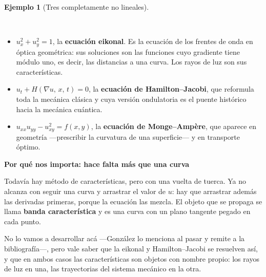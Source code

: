 \documentclass[
  spanish,
  a4paper,
]{scrbook}
\providecommand{\tightlist}{%
  \setlength{\itemsep}{0pt}\setlength{\parskip}{0pt}}
\theoremstyle{definition}
\theoremstyle{plain}
\theoremstyle{definition}
\newtheorem{example}{Ejemplo}[chapter]
\theoremstyle{plain}
\theoremstyle{definition}
\theoremstyle{remark}
\begin{document}
\begin{example}[Tres completamente no
lineales]\protect\hypertarget{exm-no-lineales}{}\label{exm-no-lineales}

~

\begin{itemize}
\tightlist
\item
  \(u_x^2 + u_y^2 = 1\), la \textbf{ecuación eikonal}. Es la ecuación de
  los frentes de onda en óptica geométrica: sus soluciones son las
  funciones cuyo gradiente tiene módulo uno, es decir, las distancias a
  una curva. Los rayos de luz son sus características.
\item
  \(u_t + H(\nabla u,\, x,\, t) = 0\), la \textbf{ecuación de
  Hamilton--Jacobi}, que reformula toda la mecánica clásica y cuya
  versión ondulatoria es el puente histórico hacia la mecánica cuántica.
\item
  \(u_{xx}u_{yy} - u_{xy}^2 = f(x,y)\), la \textbf{ecuación de
  Monge--Ampère}, que aparece en geometría ---prescribir la curvatura de
  una superficie--- y en transporte óptimo.
\end{itemize}

\end{example}

\begin{tcolorbox}[enhanced jigsaw, arc=.35mm, bottomrule=.15mm, breakable, colback=white, colframe=quarto-callout-tip-color-frame, left=2mm, leftrule=.75mm, opacityback=0, rightrule=.15mm, toprule=.15mm]
\begin{minipage}[t]{5.5mm}
\textcolor{quarto-callout-tip-color}{\faLightbulb}
\end{minipage}%
\begin{minipage}[t]{\textwidth - 5.5mm}

\vspace{-3mm}\textbf{Por qué nos importa: hace falta más que una curva}\vspace{3mm}

Todavía hay método de características, pero con una vuelta de tuerca. Ya
no alcanza con seguir una curva y arrastrar el valor de \(u\): hay que
arrastrar además las derivadas primeras, porque la ecuación las mezcla.
El objeto que se propaga se llama \textbf{banda característica} y es una
curva con un plano tangente pegado en cada punto.

No lo vamos a desarrollar acá ---González lo menciona al pasar y remite
a la bibliografía---, pero vale saber que la eikonal y Hamilton--Jacobi
se resuelven así, y que en ambos casos las características son objetos
con nombre propio: los rayos de luz en una, las trayectorias del sistema
mecánico en la otra.

\end{minipage}%
\end{tcolorbox}
\end{document}
